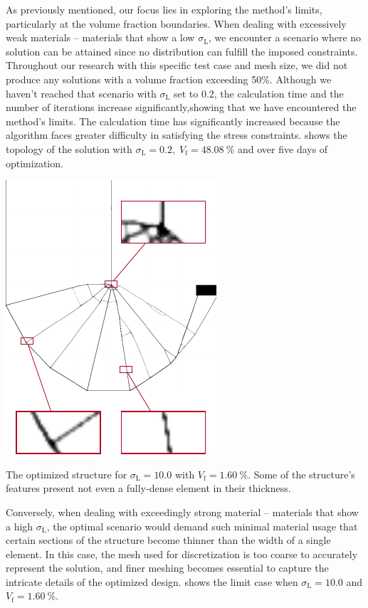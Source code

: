As previously mentioned, our focus lies in exploring the method's limits, particularly at the volume fraction boundaries. When dealing with excessively weak materials -- \ie materials that show a low $\sigma_\text{L}$, we encounter a scenario where no solution can be attained since no distribution can fulfill the imposed constraints. Throughout our research with this specific test case and mesh size, we did not produce any solutions with a volume fraction exceeding 50\%. Although we haven't reached that scenario with $\sigma_\text{L}$ set to 0.2, the calculation time and the number of iterations increase significantly,showing that we have encountered the method's limits. The calculation time has significantly increased because the algorithm faces greater difficulty in satisfying the stress constraints.  shows the topology of the solution with $\sigma_\text{L}=0.2, \; V_\text{f}=\qty{48.08}{\percent}$ and over five days of optimization.

\begin{marginfigure}
    \centering
    \includegraphics[width=0.8\linewidth]{figures/03_comparison_TO_TTO/09_to_zoom/to_zoom.pdf}
    \caption{The optimized structure for $\sigma_\text{L}=10.0$ with $V_\text{f}=\qty{1.60}{\percent}$. Some of the structure's features present not even a fully-dense element in their thickness.}
    \label{fig:03_to_sol_zoom}
\end{marginfigure}
Conversely, when dealing with exceedingly strong material -- \ie materials that show a high $\sigma_\text{L}$, the optimal scenario would demand such minimal material usage that certain sections of the structure become thinner than the width of a single element. In this case, the mesh used for discretization is too coarse to accurately represent the solution, and finer meshing becomes essential to capture the intricate details of the optimized design.  shows
the limit case when $\sigma_\text{L}=10.0$ and $V_\text{f}=\qty{1.60}{\percent}$.


